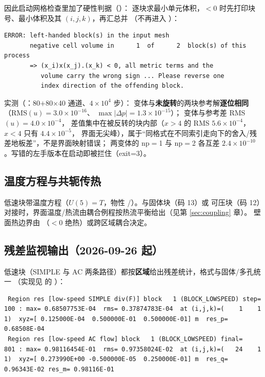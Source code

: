 因此启动网格检查里加了硬性判据（）：
逐块求最小单元体积，$<0$ 时先打印块号、最小体积及其 $(i,j,k)$，再汇总并
（不再进入 ）：
\begin{lstlisting}
ERROR: left-handed block(s) in the input mesh
       negative cell volume in      1  of      2  block(s) of this process
       => (x_i)x(x_j).(x_k) < 0, all metric terms and the
          volume carry the wrong sign ... Please reverse one
          index direction of the offending block.
\end{lstlisting}
实测（：80$+$80$\times$40 通道、$4\times10^{4}$ 步）：
 变体与\textbf{未旋转}的两块参考解\textbf{逐位相同}（RMS$(u)=3.0\times10^{-16}$、
$\max|\Delta p|=1.3\times10^{-15}$）； 变体与参考差 RMS$(u)=4.0\times10^{-4}$，
差值集中在被反转的块内部（$x>4$ 的 RMS $5.6\times10^{-4}$，$x<4$ 只有 $4.4\times10^{-5}$，
界面无尖峰），属于“同格式在不同索引走向下的舍入/残差地板差”，不是界面映射错误；
两变体的 np$=$1 与 np$=$2 各互差 $2.4\times10^{-10}$。写错的左手版本在启动即被拦住（exit=3）。


\subsection{温度方程与共轭传热}
低速块带温度方程（$U(5)=T$，物性 /）。与固体块（码 13）或
可压块（码 12）对接时，界面温度/热流由耦合例程按热流平衡给出（见第 \ref{sec:coupling} 章）。
壁面热边界由 （$<0$ 绝热）或跨区域耦合决定。

\subsection{残差监视输出（2026-09-26 起）}
低速块（SIMPLE 与 AC 两条路径）都按\textbf{区域}给出残差统计，格式与固体/多孔统一
（实现见  的 ）：

\begin{lstlisting}
 Region res [low-speed SIMPLE div(F)] block   1 (BLOCK_LOWSPEED) step=    100 : max= 0.68507753E-04  rms= 0.37874783E-04  at (i,j,k)=(    1    1    1)  xyz=[ 0.125000E-04  0.500000E-01  0.500000E-01] m  res_p= 0.68508E-04
 Region res [low-speed AC flow] block   1 (BLOCK_LOWSPEED) final=    801 : max= 0.98116454E-01  rms= 0.97358024E-02  at (i,j,k)=(   24    1    1)  xyz=[ 0.273990E+00 -0.500000E-05  0.250000E-01] m  res_q= 0.96343E-02 res_m= 0.98116E-01
\end{lstlisting}

